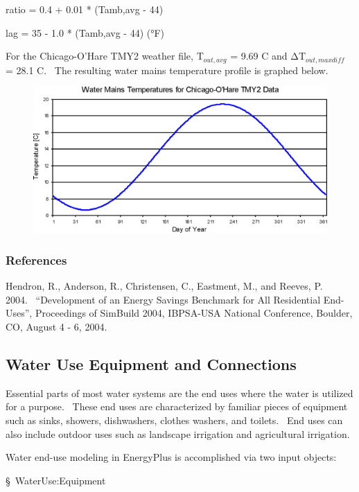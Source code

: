 ratio = 0.4 + 0.01 * (Tamb,avg - 44)

lag = 35 - 1.0 * (Tamb,avg - 44) (°F)

For the Chicago-O'Hare TMY2 weather file, T\(_{out,avg}\) = 9.69 C and ΔT\(_{out,maxdiff}\) = 28.1 C.~ The resulting water mains temperature profile is graphed below.

\begin{figure}[htbp]
\centering
\includegraphics{media/image6936.png}
\caption{}
\end{figure}

\subsubsection{References}\label{references-052}

Hendron, R., Anderson, R., Christensen, C., Eastment, M., and Reeves, P.~ 2004.~ ``Development of an Energy Savings Benchmark for All Residential End-Uses'', Proceedings of SimBuild 2004, IBPSA-USA National Conference, Boulder, CO, August 4 - 6, 2004.

\subsection{Water Use Equipment and Connections}\label{water-use-equipment-and-connections}

Essential parts of most water systems are the end uses where the water is utilized for a purpose.~ These end uses are characterized by familiar pieces of equipment such as sinks, showers, dishwashers, clothes washers, and toilets.~ End uses can also include outdoor uses such as landscape irrigation and agricultural irrigation.

Water end-use modeling in EnergyPlus is accomplished via two input objects:

§~WaterUse:Equipment

